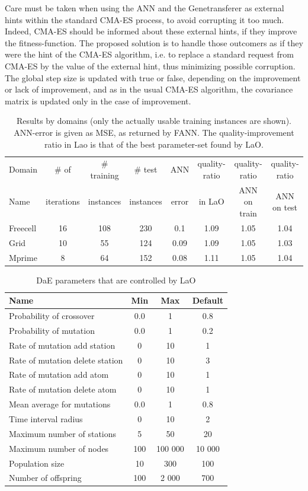 \documentclass{MYsig-alternate}
\begin{document}
Care must be taken when using the ANN and the Genetransferer as external hints within the standard CMA-ES process, to avoid corrupting it too much. Indeed, CMA-ES should be informed about these external hints, if they improve the fitness-function. The proposed solution is to handle those outcomers as if they were the hint of the CMA-ES algorithm, i.e. to replace a standard request from CMA-ES by the value of the external hint, thus minimizing possible corruption. The global step size is updated with true or false, depending on the improvement or lack of improvement, and as in the usual CMA-ES algorithm, the covariance matrix is updated only in the case of improvement.

\begin{table}[ht]
\centering
\begin{tabular}{l c c c c c c c}
\hline\hline
Domain & \# of & \# training & \# test &  ANN & quality-ratio & quality-ratio & quality-ratio \\ 
Name & iterations  & instances &  instances &  error & in LaO & ANN on train & ANN on test \\ 
\hline
Freecell& 16 & 108 & 230 & 0.1 & 1.09 & 1.05 & 1.04  \\
Grid & 10 & 55 & 124 & 0.09 & 1.09 & 1.05 & 1.03  \\
Mprime & 8 & 64 & 152 & 0.08 & 1.11 & 1.05 & 1.04   \\
\hline
\end{tabular}
\caption{Results by domains (only the actually usable training instances are shown). ANN-error is given as MSE, as returned by FANN. The quality-improvement ratio in Lao is that of the best parameter-set found by LaO.}
\label{table:domains}
\end{table} 


\begin{table}[ht]
\centering
\begin{tabular}{l c c c}
\hline\hline
Name & Min & Max & Default \\ 
\hline
Probability of crossover & 0.0 & 1 & 0.8 \\
Probability of mutation & 0.0& 1& 0.2 \\
Rate of mutation add station& 0& 10& 1 \\
Rate of mutation delete station& 0& 10& 3 \\
Rate of mutation add atom& 0& 10& 1 \\
Rate of mutation delete atom& 0& 10& 1 \\
Mean average for mutations& 0.0& 1& 0.8 \\
Time interval radius& 0& 10& 2 \\
Maximum number of stations& 5& 50& 20 \\
Maximum number of nodes& 100& 100 000& 10 000 \\
Population size& 10& 300& 100 \\
Number of offspring & 100& 2 000& 700 \\
\hline
\end{tabular}
\caption{DaE parameters that are controlled by LaO}
\label{table:parameters}
\end{table} 
\end{document}
